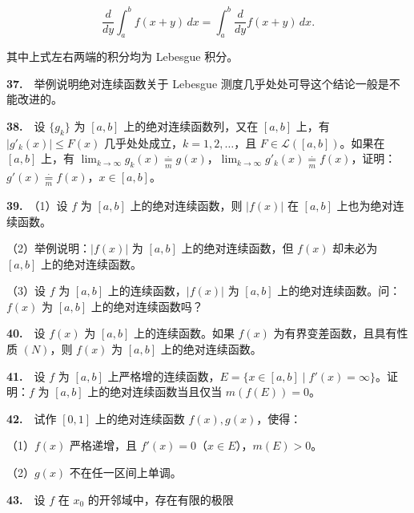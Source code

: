 \documentclass[11pt,a4paper]{article}
\begin{document}
\[
\frac d{dy}\int_a^b f(x+y)\,dx=\int_a^b\frac d{dy}f(x+y)\,dx.
\]

其中上式左右两端的积分均为 Lebesgue 积分。

\par{}\hypertarget{review37}{}\noindent \textbf{37.}　举例说明绝对连续函数关于 Lebesgue 测度几乎处处可导这个结论一般是不能改进的。

\par{}\hypertarget{review38}{}\noindent \textbf{38.}　设 \(\{g_k\}\) 为 \([a,b]\) 上的绝对连续函数列，又在 \([a,b]\) 上，有 \(|g'_k(x)|\le F(x)\) 几乎处处成立，\(k=1,2,\ldots\)，且 \(F\in\mathcal L([a,b])\)。如果在 \([a,b]\) 上，有 \(\lim_{k\to\infty}g_k(x)\underset{m}{\overset{\cdot}{=}} g(x)\)，\(\lim_{k\to\infty}g'_k(x)\underset{m}{\overset{\cdot}{=}} f(x)\)，证明：\(g'(x)\underset{m}{\overset{\cdot}{=}} f(x)\)，\(x\in[a,b]\)。

\par{}\hypertarget{review39}{}\noindent \textbf{39.}　（1）设 \(f\) 为 \([a,b]\) 上的绝对连续函数，则 \(|f(x)|\) 在 \([a,b]\) 上也为绝对连续函数。

（2）举例说明：\(|f(x)|\) 为 \([a,b]\) 上的绝对连续函数，但 \(f(x)\) 却未必为 \([a,b]\) 上的绝对连续函数。

（3）设 \(f\) 为 \([a,b]\) 上的连续函数，\(|f(x)|\) 为 \([a,b]\) 上的绝对连续函数。问：\(f(x)\) 为 \([a,b]\) 上的绝对连续函数吗？

\par{}\hypertarget{review40}{}\noindent \textbf{40.}　设 \(f(x)\) 为 \([a,b]\) 上的连续函数。如果 \(f(x)\) 为有界变差函数，且具有性质 \((N)\)，则 \(f(x)\) 为 \([a,b]\) 上的绝对连续函数。

\par{}\hypertarget{review41}{}\noindent \textbf{41.}　设 \(f\) 为 \([a,b]\) 上严格增的连续函数，\(E=\{x\in[a,b]\mid f'(x)=\infty\}\)。证明：\(f\) 为 \([a,b]\) 上的绝对连续函数当且仅当 \(m(f(E))=0\)。

\par{}\hypertarget{review42}{}\noindent \textbf{42.}　试作 \([0,1]\) 上的绝对连续函数 \(f(x),g(x)\)，使得：

（1）\(f(x)\) 严格递增，且 \(f'(x)=0\)（\(x\in E\)），\(m(E)>0\)。

（2）\(g(x)\) 不在任一区间上单调。

\par{}\hypertarget{review43}{}\noindent \textbf{43.}　设 \(f\) 在 \(x_0\) 的开邻域中，存在有限的极限
\end{document}
